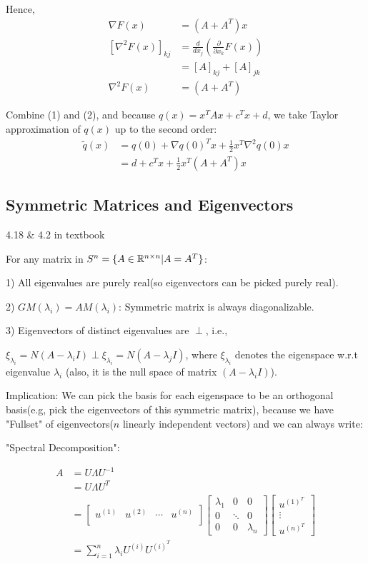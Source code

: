 Hence,
\begin{align*}
\nabla F(x) &= (A + A^T)x\\
[\nabla^2F(x)]_{kj} &= \frac{d}{dx_j}(\frac{\partial}{\partial x_k}F(x))\\
&= [A]_{kj} + [A]_{jk}\\
\nabla^2F(x) &= (A + A^T)
\end{align*}

Combine (1) and (2), and because $q(x) = x^TAx + c^Tx + d$, we take Taylor approximation of $q(x)$ up to the second order:
\begin{align*}
\tilde{q}(x) &= q(0) + \nabla q(0)^Tx + \frac{1}{2}x^T\nabla^2q(0)x\\
&= d + c^Tx + \frac{1}{2}x^T(A + A^T)x
\end{align*}

\subsection{Symmetric Matrices and Eigenvectors}

\begin{theorem}{4.18 \& 4.2 in textbook}
	
	For any matrix in $S^n = \{A\in \mathbb{R}^{n\times n} | A = A^T \}$:
	
	1) All eigenvalues are purely real(so eigenvectors can be picked purely real).
	
	2) $GM(\lambda_i) = AM(\lambda_i)$: Symmetric matrix is always diagonalizable.
	
	3) Eigenvectors of distinct eigenvalues are $\perp$, i.e.,
	
\qquad $\xi_{\lambda_i} = N(A - \lambda_iI)\perp \xi_{\lambda_i} = N(A - \lambda_jI)$, where $\xi_{\lambda_i}$ denotes the eigenspace w.r.t eigenvalue $\lambda_i$ (also, it is the null space of matrix $(A - \lambda_iI)$).
\end{theorem}

Implication: We can pick the basis for each eigenspace to be an orthogonal basis(e.g, pick the eigenvectors of this symmetric matrix), because we have "Fullset" of eigenvectors($n$ linearly independent vectors) and we can always write:

"Spectral Decomposition":

\begin{align*}
A &= U\Lambda U^{-1}\\
&= U\Lambda U^{T}\\
&= 
\begin{bmatrix}
u^{(1)} & u^{(2)} & \cdots & u^{(n)}\\
\end{bmatrix}
\begin{bmatrix}
\lambda_1 & 0 & 0\\
0 & \ddots & 0\\
0 & 0 & \lambda_n
\end{bmatrix}
\begin{bmatrix}
u^{(1)^T}\\
\vdots\\
u^{(n)^T}
\end{bmatrix}\\
&= \sum^n_{i=1}\lambda_iU^{(i)}U^{(i)^T}
\end{align*}

